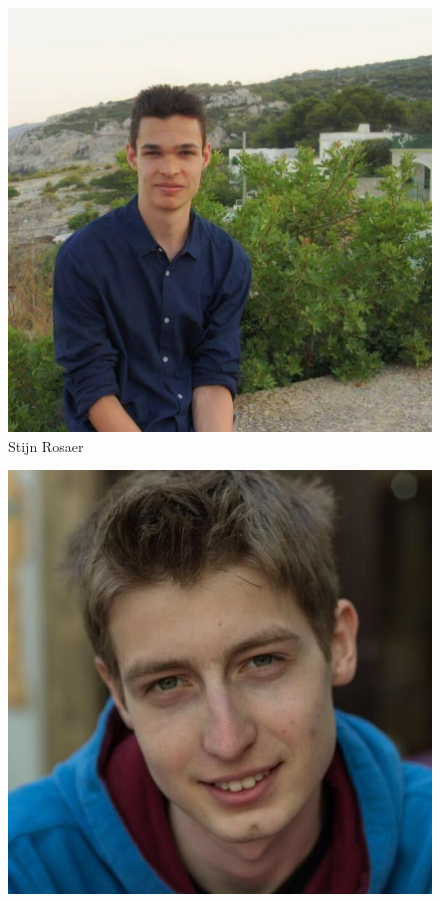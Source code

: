 \begin{frame}
\begin{figure}
\begin{minipage}{0.3\linewidth}
			\includegraphics[width=\linewidth]{res/stijn} \\
           	\footnotesize Stijn Rosaer
       	\end{minipage}
        \begin{minipage}{0.3\linewidth}
           	\centering
			\includegraphics[width=\linewidth]{res/igor} \\

\end{minipage}
\end{figure}
\end{frame}
